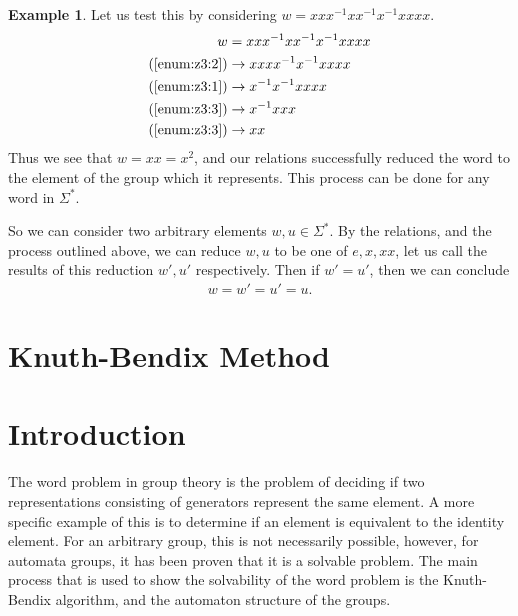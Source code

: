 \documentclass[10pt]{amsart}
\theoremstyle{definition}
\newtheorem*{iexample}{Example}
\theoremstyle{remark}
\newenvironment{example}{\begin{center}\begin{minipage}{0.9\textwidth}\begin{iexample}}{\end{iexample}\end{minipage}\end{center}}
\begin{document}
\begin{example}
  Let us test this by considering $w=xxx^{-1}xx^{-1}x^{-1}xxxx$.
  \begin{align*}
    w&=xxx^{-1}xx^{-1}x^{-1}xxxx\\
    (\ref{enum:z3:2})&\rightarrow xxxx^{-1}x^{-1}xxxx\\
    (\ref{enum:z3:1})&\rightarrow x^{-1}x^{-1}xxxx\\
    (\ref{enum:z3:3})&\rightarrow x^{-1}xxx\\
    (\ref{enum:z3:3})&\rightarrow xx\\
  \end{align*}
  Thus we see that $w=xx=x^2$, and our relations successfully reduced the word
  to the element of the group which it represents. This process can be done for
  any word in $\Sigma^*$.

  So we can consider two arbitrary elements $w,u\in\Sigma^*$. By the relations,
  and the process outlined above, we can reduce $w,u$ to be one of $e,x,xx$,
  let us call the results of this reduction $w',u'$ respectively. Then if
  $w'=u'$, then we can conclude
  \begin{align*}
    w=w'=u'=u.
  \end{align*}
\end{example}


\section{Knuth-Bendix Method}%
\label{sec:Knuth-Bendix Method}




\newpage

\section{Introduction}%
\label{sec:Introduction}

The word problem in group theory is the problem of deciding if two
representations consisting of generators represent the same element. A more
specific example of this is to determine if an element is equivalent to the
identity element. For an arbitrary group, this is not necessarily possible,
however, for automata groups, it has been proven that it is a solvable problem.
The main process that is used to show the solvability of the word problem is
the Knuth-Bendix algorithm, and the automaton structure of the groups.
\end{document}
